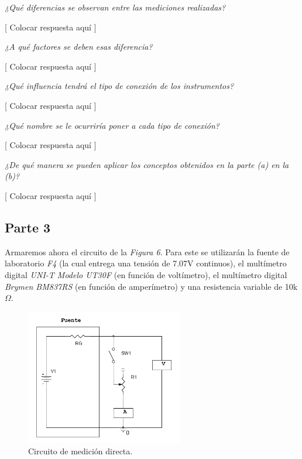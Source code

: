 \documentclass{article}
\begin{document}

\textit{¿Qué diferencias se observan entre las mediciones realizadas?}
\medskip

	[ Colocar respuesta aquí ]
\bigskip\bigskip


\textit{¿A qué factores se deben esas diferencia?}
\medskip

	[ Colocar respuesta aquí ]
\bigskip\bigskip


\textit{¿Qué influencia tendrá el tipo de conexión de los instrumentos?}
\medskip

	[ Colocar respuesta aquí ]
\bigskip


\textit{¿Qué nombre se le ocurriría poner a cada tipo de conexión?}
\medskip

	[ Colocar respuesta aquí ]
\bigskip


\textit{¿De qué manera se pueden aplicar los conceptos obtenidos en la parte (a) en la (b)?}
\medskip

	[ Colocar respuesta aquí ]
\bigskip\bigskip



\subsection{Parte 3}


	Armaremos ahora el circuito de la \textit{Figura 6}. Para este se utilizarán la fuente de laboratorio \textit{F4} (la cual entrega una tensión de 7.07V continuos), el multímetro digital \textit{UNI-T Modelo UT30F} (en función de voltímetro), el multímetro digital \textit{Brymen BM837RS} (en función de amperímetro) y una resistencia variable de 10k$\Omega$.
\bigskip


\begin{figure}[h]
	\centering
	\includegraphics[width=0.61\textwidth]{images/p3-item-a.jpg}
	\caption{Circuito de medición directa.}
\end{figure}
\bigskip\bigskip
\end{document}
